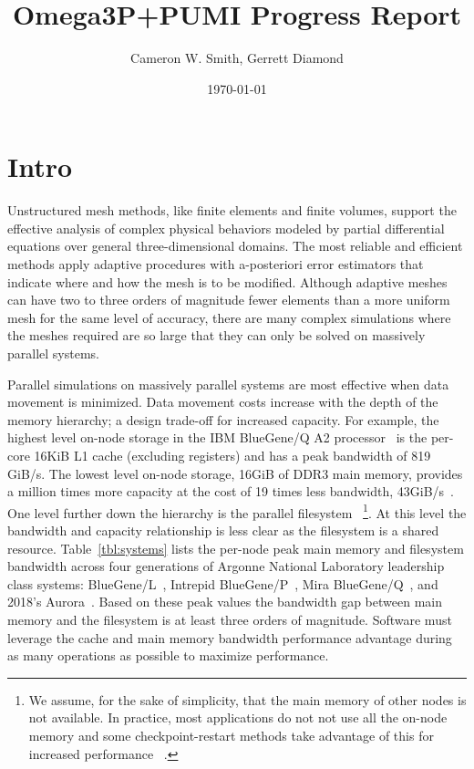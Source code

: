 \documentclass[a4paper]{article}
\title{Omega3P+PUMI Progress Report}
\author{Cameron W. Smith, Gerrett Diamond}
\date{\today}
\begin{document}
\maketitle
\section{Intro}

Unstructured mesh methods, like finite elements and finite volumes, support the
effective analysis of complex physical behaviors modeled by partial differential
equations over general three-dimensional domains.
The most reliable and efficient methods apply adaptive procedures with
a-posteriori error estimators that indicate where and how the mesh is to be
modified.
Although adaptive meshes can have two to three orders of magnitude fewer
elements than a more uniform mesh for the same level of accuracy, there are many
complex simulations where the meshes required are so large that they can only be
solved on massively parallel systems.

Parallel simulations on massively parallel systems are most effective when data
movement is minimized.
Data movement costs increase with the depth of the memory hierarchy; a design
trade-off for increased capacity.
For example, the highest level on-node storage in the IBM BlueGene/Q A2
processor~\cite{haring2012ibm} is the per-core 16KiB L1 cache (excluding
registers) and has a peak bandwidth of 819 GiB/s.
The lowest level on-node storage, 16GiB of DDR3 main memory, provides a million
times more capacity at the cost of 19 times less bandwidth,
43GiB/s~\cite{lo2014roofline}.
One level further down the hierarchy is the parallel filesystem
~\footnote{We assume, for the sake of simplicity, that the main memory of other nodes is not
available.
In practice, most applications do not not use all the on-node memory and some
checkpoint-restart methods take advantage of this for increased performance
~\cite{rma-fault-tolerance-2014,isaila2014making,compression-cr-2012}.
}.
At this level the bandwidth and capacity relationship is less clear as the
filesystem is a shared resource.
Table~\ref{tbl:systems} lists the per-node peak main memory and filesystem
bandwidth across four generations of Argonne National Laboratory leadership
class systems: BlueGene/L~\cite{yu2006high,adiga2002overview}, Intrepid
BlueGene/P~\cite{lang2009performance,alam2008early}, Mira
BlueGene/Q~\cite{haring2012ibm,bui2014scalable}, and 2018's
Aurora~\cite{aurorafacts}.
Based on these peak values the bandwidth gap between main memory and the
filesystem is at least three orders of magnitude.
Software must leverage the cache and main memory bandwidth performance advantage
during as many operations as possible to maximize performance.
\end{document}
